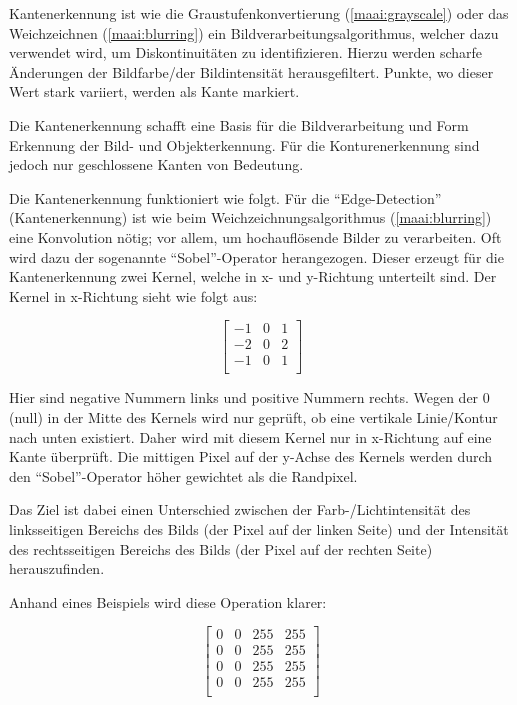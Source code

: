 Kantenerkennung ist wie die Graustufenkonvertierung (\ref{maai:grayscale}) oder das Weichzeichnen (\ref{maai:blurring}) ein Bildverarbeitungsalgorithmus, welcher dazu verwendet wird, um Diskontinuitäten zu identifizieren. Hierzu werden scharfe Änderungen der Bildfarbe/der Bildintensität herausgefiltert. Punkte, wo dieser Wert stark variiert, werden als Kante markiert.

Die Kantenerkennung schafft eine Basis für die Bildverarbeitung und Form Erkennung der Bild- und Objekterkennung. Für die Konturenerkennung sind jedoch nur geschlossene Kanten von Bedeutung.

Die Kantenerkennung funktioniert wie folgt. Für die ``Edge-Detection'' (Kantenerkennung) ist wie beim Weichzeichnungsalgorithmus (\ref{maai:blurring}) eine Konvolution nötig; vor allem, um hochauflösende Bilder zu verarbeiten. Oft wird dazu der sogenannte ``Sobel''-Operator herangezogen. Dieser erzeugt für die Kantenerkennung zwei Kernel, welche in x- und y-Richtung unterteilt sind. Der Kernel in x-Richtung sieht wie folgt aus:

\[
    \left[\begin{array}{rrr}
            -1 & 0 & 1 \\
            -2 & 0 & 2 \\
            -1 & 0 & 1 \\
        \end{array}\right]
\]


Hier sind negative Nummern links und positive Nummern rechts. Wegen der 0 (null) in der Mitte des Kernels wird nur geprüft, ob eine vertikale Linie/Kontur nach unten existiert. Daher wird mit diesem Kernel nur in x-Richtung auf eine Kante überprüft. Die mittigen Pixel auf der y-Achse des Kernels werden durch den ``Sobel''-Operator höher gewichtet als die Randpixel.

Das Ziel ist dabei einen Unterschied zwischen der Farb-/Lichtintensität des linksseitigen Bereichs des Bilds (der Pixel auf der linken Seite) und der Intensität des rechtsseitigen Bereichs des Bilds (der Pixel auf der rechten Seite) herauszufinden.

Anhand eines Beispiels wird diese Operation klarer:

\[
    \left[\begin{array}{rrrr}
            0 & 0 & 255 & 255 \\
            0 & 0 & 255 & 255 \\
            0 & 0 & 255 & 255 \\
            0 & 0 & 255 & 255 \\
        \end{array}\right]
\]

